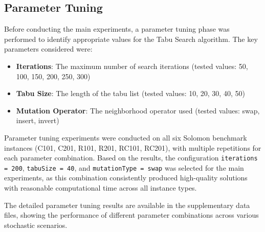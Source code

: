 \subsection{Parameter Tuning}

Before conducting the main experiments, a parameter tuning phase was performed to identify appropriate values for the Tabu Search algorithm. The key parameters considered were:
\begin{itemize}
    \item \textbf{Iterations}: The maximum number of search iterations (tested values: 50, 100, 150, 200, 250, 300)
    \item \textbf{Tabu Size}: The length of the tabu list (tested values: 10, 20, 30, 40, 50)
    \item \textbf{Mutation Operator}: The neighborhood operator used (tested values: swap, insert, invert)
\end{itemize}

Parameter tuning experiments were conducted on all six Solomon benchmark instances (C101, C201, R101, R201, RC101, RC201), with multiple repetitions for each parameter combination. Based on the results, the configuration \texttt{iterations = 200}, \texttt{tabuSize = 40}, and \texttt{mutationType = swap} was selected for the main experiments, as this combination consistently produced high-quality solutions with reasonable computational time across all instance types.

The detailed parameter tuning results are available in the supplementary data files, showing the performance of different parameter combinations across various stochastic scenarios.
